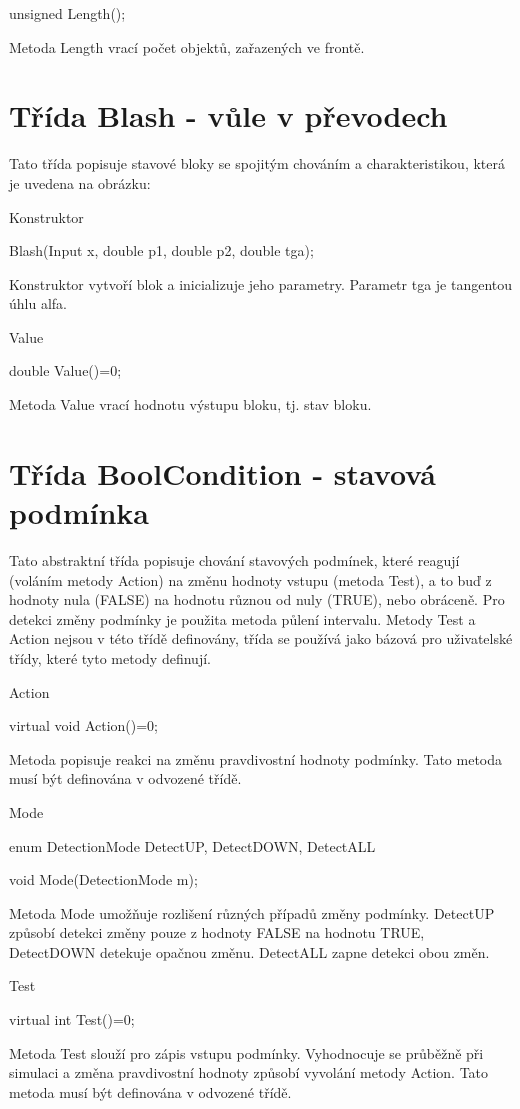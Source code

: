 \documentclass[a4paper]{article}
\begin{document}
  unsigned Length();

Metoda Length vrací počet objektů, zařazených ve frontě.

\section{Třída Blash - vůle v převodech}

Tato třída popisuje stavové bloky se spojitým chováním a charakteristikou,
která je uvedena na obrázku:

Konstruktor

  Blash(Input x, double p1, double p2, double tga);

Konstruktor vytvoří blok a inicializuje jeho parametry. Parametr
tga je tangentou úhlu alfa.

Value

  double Value()=0;

Metoda Value vrací hodnotu výstupu bloku, tj. stav bloku.


\section{Třída BoolCondition - stavová podmínka}

Tato abstraktní třída popisuje chování stavových podmínek, které
reagují (voláním metody Action) na změnu hodnoty vstupu
(metoda Test), a to buď z hodnoty nula (FALSE) na hodnotu
různou od nuly (TRUE), nebo obráceně. Pro detekci změny podmínky
je použita metoda půlení intervalu. Metody Test a Action
nejsou v této třídě definovány, třída se používá jako bázová
pro uživatelské třídy, které tyto metody definují.

Action

  virtual void Action()=0;

Metoda popisuje reakci na změnu pravdivostní hodnoty podmínky. Tato
metoda musí být definována v odvozené třídě.


Mode

  enum DetectionMode { DetectUP, DetectDOWN, DetectALL }

  void Mode(DetectionMode m);


Metoda Mode umožňuje rozlišení různých případů změny podmínky.
DetectUP způsobí detekci změny pouze z hodnoty FALSE na
hodnotu TRUE, DetectDOWN  detekuje opačnou změnu. DetectALL
zapne detekci obou změn.


Test

  virtual int Test()=0;


Metoda Test slouží pro zápis vstupu podmínky. Vyhodnocuje
se průběžně při simulaci a změna pravdivostní hodnoty způsobí vyvolání
metody Action. Tato metoda musí být definována v  odvozené
třídě.
\end{document}

